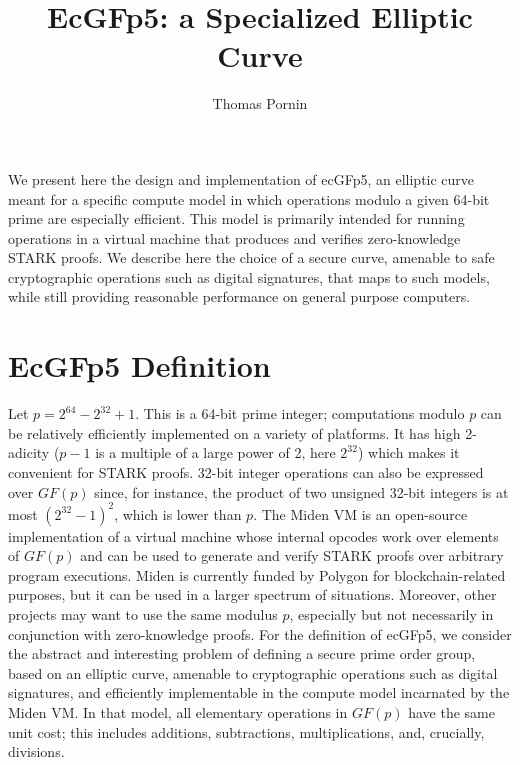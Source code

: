 \documentclass{llncs}
\makeatletter
\renewenvironment{abstract}{%
      \list{}{\advance\topsep by0.35cm\relax\small
      \leftmargin=1cm
      \labelwidth=\z@
      \listparindent=\z@
      \itemindent\listparindent
      \rightmargin\leftmargin}\item[\hskip\labelsep
                                    \textsf{\textbf{\abstractname}}]}
    {\endlist}
\newcommand{\GF}{GF}
\makeatother
\begin{document}
\title{\textsf{EcGFp5: a Specialized Elliptic Curve}}

\author{Thomas Pornin}

\maketitle
\noindent{}

\begin{abstract}
We present here the design and implementation of ecGFp5, an elliptic
curve meant for a specific compute model in which operations modulo a
given 64-bit prime are especially efficient. This model is primarily
intended for running operations in a virtual machine that produces and
verifies zero-knowledge STARK proofs. We describe here the choice of
a secure curve, amenable to safe cryptographic operations such as
digital signatures, that maps to such models, while still providing
reasonable performance on general purpose computers.
\end{abstract}


\section{EcGFp5 Definition}\label{sec:intro}

Let $p = 2^{64} - 2^{32} + 1$. This is a 64-bit prime integer;
computations modulo $p$ can be relatively efficiently implemented on a
variety of platforms. It has high 2-adicity ($p-1$ is a multiple of a
large power of 2, here $2^{32}$) which makes it convenient for STARK
proofs\cite{BenBenHorRia2018}. 32-bit integer operations can also be
expressed over $\GF(p)$ since, for instance, the product of two unsigned
32-bit integers is at most $(2^{32}-1)^2$, which is lower than $p$. The
Miden VM\cite{MidenVM} is an open-source implementation of a virtual
machine whose internal opcodes work over elements of $\GF(p)$ and can
be used to generate and verify STARK proofs over arbitrary program
executions. Miden is currently funded by Polygon for blockchain-related
purposes, but it can be used in a larger spectrum of situations.
Moreover, other projects may want to use the same modulus $p$,
especially but not necessarily in conjunction with zero-knowledge
proofs. For the definition of ecGFp5, we consider the abstract and
interesting problem of defining a secure prime order group, based on an
elliptic curve, amenable to cryptographic operations such as digital
signatures, and efficiently implementable in the compute model
incarnated by the Miden VM. In that model, all elementary operations in
$\GF(p)$ have the same unit cost; this includes additions, subtractions,
multiplications, and, crucially, divisions.
\end{document}
